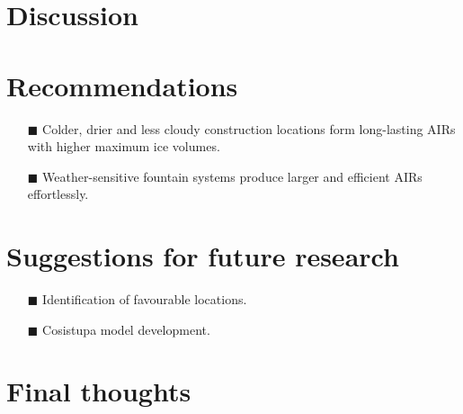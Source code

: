 \section{Discussion}

\section{Recommendations}

\begin{itemize} 

\item[\tiny{$\blacksquare$}] Colder, drier and less cloudy construction locations form long-lasting AIRs with
  higher maximum ice volumes. 

\item[\tiny{$\blacksquare$}] Weather-sensitive fountain systems produce larger and efficient AIRs effortlessly. 

\end{itemize}

\section{Suggestions for future research}

\begin{itemize} 

\item[\tiny{$\blacksquare$}] Identification of favourable locations.

\item[\tiny{$\blacksquare$}] Cosistupa model development.


\end{itemize}

\section{Final thoughts}
